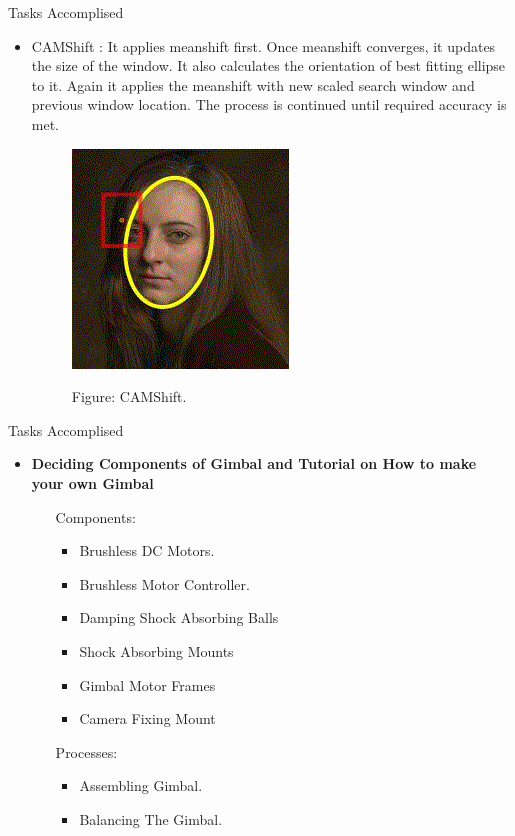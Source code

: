 \documentclass[10pt, a4paper]{beamer}
\begin{document}
\begin{frame}{Tasks Accomplised}
	\begin{itemize}		
		\item CAMShift : It applies meanshift first. Once meanshift converges, it updates the size of the window. It also calculates the orientation of best fitting ellipse to it. Again it applies the meanshift with new scaled search window and previous window location. The process is continued until required accuracy is met.
		\begin{figure}
		\begin{center}
			\includegraphics[scale=0.4]{result.png}
		\end{center}
		\begin{center}
			Figure: CAMShift.
		\end{center}
	\end{figure}
	\end{itemize}
\end{frame}
\begin{frame}{Tasks Accomplised}
	\begin{itemize}		
		\item \textbf{Deciding Components of Gimbal and Tutorial on How to make your own Gimbal}
		\begin{itemize}
			\item[Components:]
			\begin{itemize}
				\item Brushless DC Motors.
				\item Brushless Motor Controller.
				\item Damping Shock Absorbing Balls
				\item Shock Absorbing Mounts
				\item Gimbal Motor Frames
				\item Camera Fixing Mount
			\end{itemize}
			\item[Processes:]
			\begin{itemize}
				\item Assembling Gimbal.
				\item Balancing The Gimbal.
			\end{itemize}
		\end{itemize}
	\end{itemize}
\end{frame}
\end{document}
